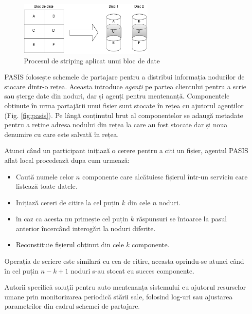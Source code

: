 \documentclass[oneside, 12pt]{book}
\begin{document}
\begin{figure}
	\begin{center}
	\includegraphics[width=0.6\textwidth]{img/raid0.png}
	\caption{Procesul de striping aplicat unui bloc de date}
	\label{fig:raid_strip}
	\end{center}
	\bigskip
\end{figure}

PASIS folosește schemele de partajare pentru a distribui informația nodurilor de stocare dintr-o rețea. Aceasta introduce \textit{agenți} pe partea clientului pentru a scrie sau șterge date din noduri, dar și agenți pentru mentenanță. Componentele obținute în urma partajării unui fișier sunt stocate în rețea cu ajutorul agenților (Fig. \ref{fig:pasis}). Pe lângă conținutul brut al componentelor se adaugă metadate pentru a reține adresa nodului din rețea la care au fost stocate dar și noua denumire cu care este salvată în rețea.

Atunci când un participant inițiază o cerere pentru a citi un fișier, agentul PASIS aflat local procedează dupa cum urmează:
\begin{itemize}
	\item Caută numele celor $n$ componente care alcătuiesc fișierul într-un serviciu care listează toate datele.
	\item Inițiază cereri de citire la cel puțin $k$ din cele $n$ noduri.
	\item în caz ca acesta nu primește cel puțin $k$ răspunsuri se întoarce la pasul anterior încercând interogări la noduri diferite.
	\item Reconstituie fișierul obținut din cele $k$ componente.
\end{itemize}
Operația de scriere este similară cu cea de citire, aceasta oprindu-se atunci când în cel puțin $n - k + 1$ noduri s-au stocat cu succes componente.

Autorii specifică soluții pentru auto mentenanța sistemului cu ajutorul resurselor umane prin monitorizarea periodică stării sale, folosind log-uri sau ajustarea parametrilor din cadrul schemei de partajare.
\end{document}
